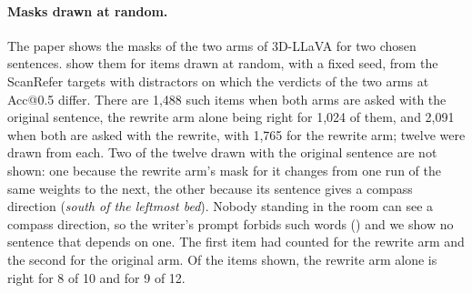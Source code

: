 \paragraph{Masks drawn at random.}
The paper shows the masks of the two arms of 3D-LLaVA for two chosen sentences.
 show them for items drawn at random, with a fixed seed, from the ScanRefer targets with distractors on which the verdicts of the two arms at Acc@0.5 differ.
There are 1,488 such items when both arms are asked with the original sentence, the rewrite arm alone being right for 1,024 of them, and 2,091 when both are asked with the rewrite, with 1,765 for the rewrite arm; twelve were drawn from each.
Two of the twelve drawn with the original sentence are not shown: one because the rewrite arm's mask for it changes from one run of the same weights to the next, the other because its sentence gives a compass direction (\emph{south of the leftmost bed}).
Nobody standing in the room can see a compass direction, so the writer's prompt forbids such words () and we show no sentence that depends on one.
The first item had counted for the rewrite arm and the second for the original arm.
Of the items shown, the rewrite arm alone is right for 8 of 10 and for 9 of 12.
